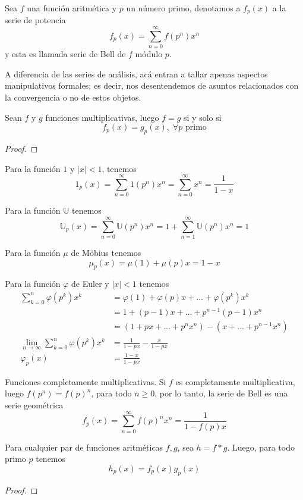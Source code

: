 \documentclass[main.tex]{subfiles}
\begin{document}
\begin{defn}
Sea $f$ una funci\'on aritm\'etica y $p$ un n\'umero primo, denotamos a $f_p(x)$ a la serie de potencia
$$f_p(x) = \sum_{n = 0}^\infty f(p^n)x^n$$
y esta es llamada serie de Bell de $f$ m\'odulo $p$.
\end{defn}
A diferencia de las series de an\'alisis, ac\'a entran a tallar apenas aspectos manipulativos formales; es decir, nos desentendemos de asuntos relacionados con la convergencia o no de estos objetos.
\begin{theorem}
Sean $f$ y $g$ funciones multiplicativas, luego $f = g$ si y solo si
$$f_p(x) = g_p(x),\;\forall p \text{ primo}$$
\end{theorem}
\begin{proof}
\end{proof}
\begin{example}
Para la funci\'on $1$ y $|x| < 1$, tenemos
$$1_p(x) = \sum_{n = 0}^\infty1(p^n)x^n = \sum_{n=0}^\infty x^n = \frac{1}{1-x}$$
\end{example}
\begin{example}
Para la funci\'on $\mathbb U$ tenemos
$$\mathbb U_p(x) = \sum_{n = 0}^\infty \mathbb U(p^n)x^n = 1 + \sum_{n = 1}^\infty \mathbb U(p^n)x^n = 1$$
\end{example}
\begin{example}
Para la funci\'on $\mu$ de M\"obius tenemos
$$\mu_p(x) = \mu(1) + \mu(p)x = 1 - x$$
\end{example}
\begin{example}
Para la funci\'on $\varphi$ de Euler y $|x| < 1$ tenemos
\begin{align*}
    \sum_{k = 0}^n \varphi(p^k)x^k &= \varphi(1) + \varphi(p)x + \dots + \varphi(p^k)x^k\\
    &= 1 + (p-1)x + \dots + p^{n-1}(p-1)x^n\\
    &= (1 + px + \dots + p^n x^n) - (x + \dots + p^{n-1}x^n)\\
    \lim_{n\to\infty}\sum_{k=0}^n \varphi(p^k)x^k &= \frac{1}{1 - px} - \frac{x}{1-px}\\
    \varphi_p(x) &= \frac{1 - x}{1 - px}
\end{align*}
\end{example}
\begin{example}
Funciones completamente multiplicativas. Si $f$ es completamente multiplicativa, luego $f(p^n) = f(p)^n$, para todo $n \geq 0$, por lo tanto, la serie de Bell es una serie geom\'etrica
$$f_p(x) = \sum_{n = 0}^\infty f(p)^n x^n = \frac{1}{1 - f(p)x}$$
\end{example}
\begin{theorem}
Para cualquier par de funciones aritm\'eticas $f, g$, sea $h = f * g$. Luego, para todo primo $p$ tenemos
$$h_p(x) = f_p(x)g_p(x)$$
\end{theorem}
\begin{proof}
\end{proof}
\end{document}
